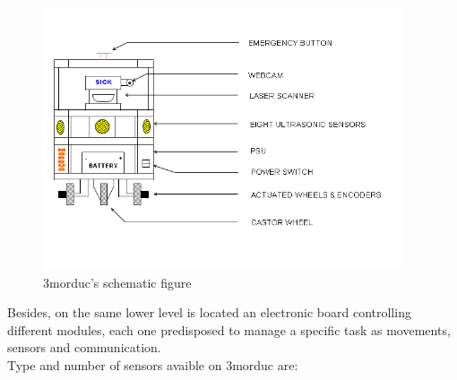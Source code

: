 \begin{figure}
  \begin{center}
    \includegraphics[width=300pt]{img/Morduc_scheme.png}
    \caption{3morduc's schematic figure}
    \label{fig:morduc_scheme}
  \end{center}
\end{figure}

Besides, on the same lower level is located an electronic board
controlling different modules, each one predisposed to manage a
specific task as movements, sensors and communication.
\\
Type and number of sensors avaible on 3morduc are:

